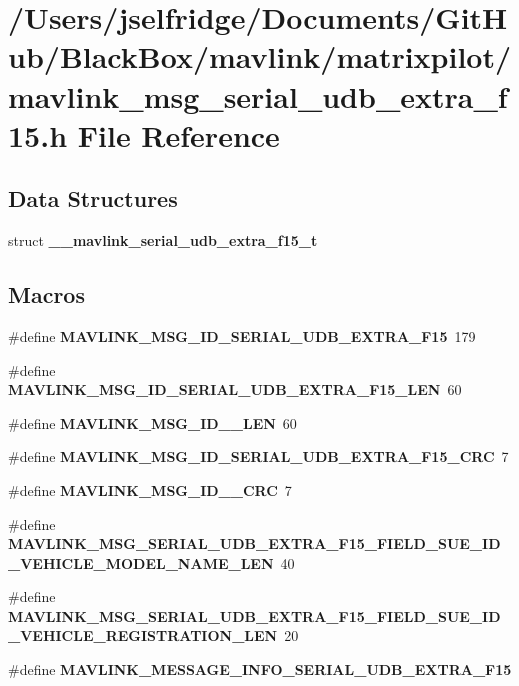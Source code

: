 \section{/\+Users/jselfridge/\+Documents/\+Git\+Hub/\+Black\+Box/mavlink/matrixpilot/mavlink\+\_\+msg\+\_\+serial\+\_\+udb\+\_\+extra\+\_\+f15.h File Reference}
\label{mavlink__msg__serial__udb__extra__f15_8h}
\subsection*{Data Structures}
\begin{DoxyCompactItemize}
\item 
struct \textbf{ \+\_\+\+\_\+mavlink\+\_\+serial\+\_\+udb\+\_\+extra\+\_\+f15\+\_\+t}
\end{DoxyCompactItemize}
\subsection*{Macros}
\begin{DoxyCompactItemize}
\item 
\#define \textbf{ M\+A\+V\+L\+I\+N\+K\+\_\+\+M\+S\+G\+\_\+\+I\+D\+\_\+\+S\+E\+R\+I\+A\+L\+\_\+\+U\+D\+B\+\_\+\+E\+X\+T\+R\+A\+\_\+\+F15}~179
\item 
\#define \textbf{ M\+A\+V\+L\+I\+N\+K\+\_\+\+M\+S\+G\+\_\+\+I\+D\+\_\+\+S\+E\+R\+I\+A\+L\+\_\+\+U\+D\+B\+\_\+\+E\+X\+T\+R\+A\+\_\+\+F15\+\_\+\+L\+EN}~60
\item 
\#define \textbf{ M\+A\+V\+L\+I\+N\+K\+\_\+\+M\+S\+G\+\_\+\+I\+D\+\_\+\_\+\+L\+EN}~60
\item 
\#define \textbf{ M\+A\+V\+L\+I\+N\+K\+\_\+\+M\+S\+G\+\_\+\+I\+D\+\_\+\+S\+E\+R\+I\+A\+L\+\_\+\+U\+D\+B\+\_\+\+E\+X\+T\+R\+A\+\_\+\+F15\+\_\+\+C\+RC}~7
\item 
\#define \textbf{ M\+A\+V\+L\+I\+N\+K\+\_\+\+M\+S\+G\+\_\+\+I\+D\+\_\+\_\+\+C\+RC}~7
\item 
\#define \textbf{ M\+A\+V\+L\+I\+N\+K\+\_\+\+M\+S\+G\+\_\+\+S\+E\+R\+I\+A\+L\+\_\+\+U\+D\+B\+\_\+\+E\+X\+T\+R\+A\+\_\+\+F15\+\_\+\+F\+I\+E\+L\+D\+\_\+\+S\+U\+E\+\_\+\+I\+D\+\_\+\+V\+E\+H\+I\+C\+L\+E\+\_\+\+M\+O\+D\+E\+L\+\_\+\+N\+A\+M\+E\+\_\+\+L\+EN}~40
\item 
\#define \textbf{ M\+A\+V\+L\+I\+N\+K\+\_\+\+M\+S\+G\+\_\+\+S\+E\+R\+I\+A\+L\+\_\+\+U\+D\+B\+\_\+\+E\+X\+T\+R\+A\+\_\+\+F15\+\_\+\+F\+I\+E\+L\+D\+\_\+\+S\+U\+E\+\_\+\+I\+D\+\_\+\+V\+E\+H\+I\+C\+L\+E\+\_\+\+R\+E\+G\+I\+S\+T\+R\+A\+T\+I\+O\+N\+\_\+\+L\+EN}~20
\item 
\#define \textbf{ M\+A\+V\+L\+I\+N\+K\+\_\+\+M\+E\+S\+S\+A\+G\+E\+\_\+\+I\+N\+F\+O\+\_\+\+S\+E\+R\+I\+A\+L\+\_\+\+U\+D\+B\+\_\+\+E\+X\+T\+R\+A\+\_\+\+F15}
\end{DoxyCompactItemize}
